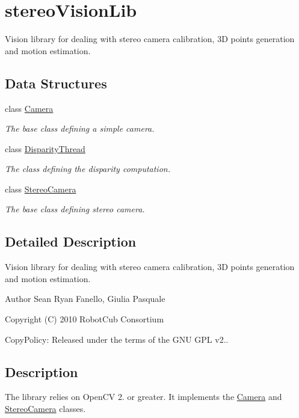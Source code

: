 \section{stereo\+Vision\+Lib}
\label{group__StereoVisionLib}


Vision library for dealing with stereo camera calibration, 3D points generation and motion estimation.  


\subsection*{Data Structures}
\begin{DoxyCompactItemize}
\item 
class \hyperlink{classCamera}{Camera}
\begin{DoxyCompactList}\small\item\em The base class defining a simple camera. \end{DoxyCompactList}\item 
class \hyperlink{classDisparityThread}{Disparity\+Thread}
\begin{DoxyCompactList}\small\item\em The class defining the disparity computation. \end{DoxyCompactList}\item 
class \hyperlink{classStereoCamera}{Stereo\+Camera}
\begin{DoxyCompactList}\small\item\em The base class defining stereo camera. \end{DoxyCompactList}\end{DoxyCompactItemize}


\subsection{Detailed Description}
Vision library for dealing with stereo camera calibration, 3D points generation and motion estimation. 

\begin{DoxyAuthor}{Author}
Sean Ryan Fanello, Giulia Pasquale
\end{DoxyAuthor}
Copyright (C) 2010 Robot\+Cub Consortium

Copy\+Policy\+: Released under the terms of the G\+NU G\+PL v2..\hypertarget{group__SFM_intro_sec}{}\subsection{Description}\label{group__SFM_intro_sec}
The library relies on Open\+CV 2. or greater. It implements the \hyperlink{classCamera}{Camera} and \hyperlink{classStereoCamera}{Stereo\+Camera} classes. 